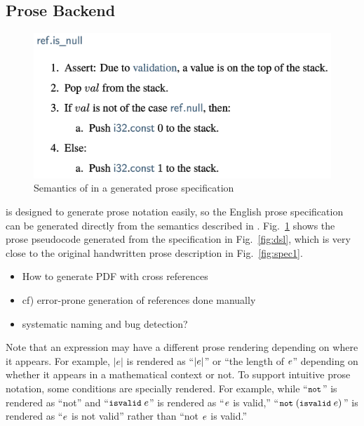 \subsection{Prose Backend}\label{sec:prose} %
\begin{figure}[t]
\centering
\includegraphics[width=.5\textwidth]{../img/genprose}
\vspace*{-1em}
\caption{Semantics of  in a generated prose specification}
\label{fig:genprose}
\end{figure}

\al is designed to generate prose notation easily,
so the English prose specification can be generated directly from the semantics described in \al.
Fig.~\ref{fig:genprose} shows the prose pseudocode generated from the specification in Fig.~\ref{fig:dsl},
which is very close to the original handwritten prose description in Fig.~\ref{fig:spec1}.

\begin{itemize}
\item How to generate PDF with cross references
\item cf) error-prone generation of references done manually
\item systematic naming and bug detection?
\end{itemize}

Note that an \al expression may have a different prose rendering
depending on where it appears. For example, $|e|$ is rendered as 
``$|e|$'' or ``the length of $e$'' depending on whether it appears in
a mathematical context or not.
To support intuitive prose notation, some \al conditions are specially rendered.
For example, while ``$\texttt{\small not}$'' is rendered as ``not'' and ``$\texttt{\small isvalid}\;e$''
is rendered as ``$e$ is valid,''
``$\texttt{\small not} \; (\texttt{\small isvalid} \; e)$'' is rendered as ``$e$ is not valid''
rather than ``not $e$ is valid.''

